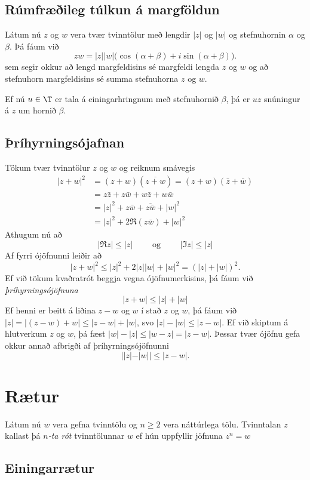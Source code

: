 \subsection*{Rúmfræðileg túlkun á margföldun}

Látum nú $z$ og $w$ vera tvær tvinntölur með lengdir 
$|z|$ og $|w|$ og stefnuhornin $\alpha$ og $\beta$.
Þá fáum við
$$
zw=|z||w|\big(\cos(\alpha+\beta)+i\sin(\alpha+\beta)\big).
$$
sem segir okkur að lengd margfeldisins sé 
margfeldi lengda $z$ og $w$ og  
að stefnuhorn margfeldisins sé summa stefnuhorna $z$  og $w$.

Ef nú $u\in \T$ er tala á einingarhringnum með stefnuhornið
$\beta$, þá er $uz$ snúningur á $z$ um hornið $\beta$.


\subsection*{Þríhyrningsójafnan}

Tökum tvær tvinntölur $z$ og $w$ og reiknum smávegis
\begin{align*}
|z+w|^2&=(z+w)(\overline{z+w})=(z+w)(\bar z+\bar w)  \\
 &=z\bar z+z\bar w+w\bar z+w\bar w\\
&=|z|^2+z\bar w+\overline{z\bar w}+|w|^2\\
&=|z|^2+2\Re(z\bar w)+|w|^2
\end{align*}
Athugum nú að
$$
|\Re z|\leq |z| \qquad \text{ og } \qquad 
|\Im z|\leq |z|
$$
Af fyrri ójöfnunni  leiðir að
$$
|z+w|^2\leq |z|^2+2|z||w|+|w|^2=(|z|+|w|)^2.
$$
Ef við tökum kvaðratrót beggja vegna ójöfnumerkisins, þá fáum við
{\it þríhyrningsójöfnuna}
$$
|z+w|\leq |z|+|w|
$$
Ef henni er beitt á liðina $z-w$ og $w$ í stað $z$ og $w$, þá fáum við
$|z|=|(z-w)+w|\leq |z-w|+|w|$, svo $|z|-|w|\leq |z-w|$.
Ef við skiptum á hlutverkum $z$ og $w$, þá fæst
$|w|-|z|\leq |w-z|=|z-w|$. Þessar tvær ójöfnu gefa okkur
annað afbrigði af þríhyrningsójöfnunni
$$
||z|-|w||\leq |z-w|.
$$

\section{Rætur}

Látum nú $w$ vera gefna tvinntölu og $n\geq 2$ vera náttúrlega tölu.
Tvinntalan $z$ kallast þá  {\it $n$-ta  rót} tvinntölunnar $w$ ef hún
uppfyllir jöfnuna $z^n=w$

\subsection*{Einingarrætur}


